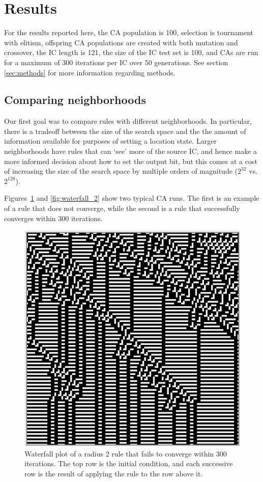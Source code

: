 \section{Results} \label{results}

For the results reported here, the CA population is 100, selection is tournament with elitism, offspring CA populations are created with both 
mutation and crossover, the IC length is 121, the size of the IC test set is 100, and CAs are run for a maximum of 
300 iterations per IC over 50 generations. See section \ref{sec:methods} 
for more information regarding methods.

\subsection{Comparing neighborhoods} \label{sec:2_1}
Our first goal was to compare rules with different neighborhoods. In particular, there is a tradeoff between the size of the search space and the 
the amount of information available for purposes of setting a location state. Larger neighborhoods have rules that can `see' more of the source IC, and 
hence make a more informed decision about how to set the output bit, but this comes at a cost of increasing the size of the search space by multiple 
orders of magnitude ($2^{32}$ vs. $2^{128}$).

Figures~\ref{fig:waterfall_1} and \ref{fig:waterfall_2} show two typical CA runs. The first is an example of a rule that does not converge, while the second 
is a rule that successfully converges within 300 iterations.

\begin{figure}
\begin{center}
\includegraphics[width=0.8\linewidth]{figures/non_converging_radius2.png}
\caption{Waterfall plot of a radius 2 rule that fails to converge within 300 iterations. The top row is the initial condition, and each successive row is the 
result of applying the rule to the row above it.}
\label{fig:waterfall_1}
\end{center}
\end{figure}

